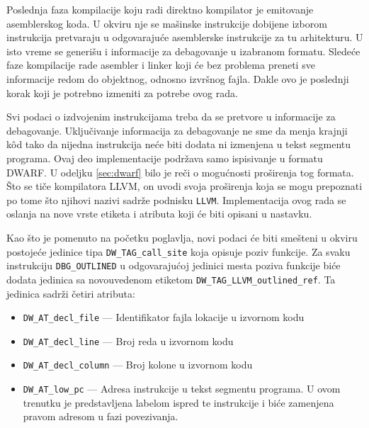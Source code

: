 \documentclass[12pt,oneside]{memoir}
\begin{document}
Poslednja faza kompilacije koju radi direktno kompilator je emitovanje asemblerskog koda.
U okviru nje se mašinske instrukcije dobijene izborom instrukcija pretvaraju u odgovarajuće asemblerske instrukcije za tu arhitekturu.
U isto vreme se generišu i informacije za debagovanje u izabranom formatu.
Sledeće faze kompilacije rade asembler i linker koji će bez problema preneti sve informacije redom do objektnog, odnosno izvršnog fajla.
Dakle ovo je poslednji korak koji je potrebno izmeniti za potrebe ovog rada.


Svi podaci o izdvojenim instrukcijama treba da se pretvore u informacije za debagovanje.
Uključivanje informacija za debagovanje ne sme da menja krajnji k\^od tako da nijedna instrukcija neće biti dodata ni izmenjena u tekst segmentu programa.
Ovaj deo implementacije podržava samo ispisivanje u formatu DWARF.
U odeljku \ref{sec:dwarf} bilo je reči o mogućnosti proširenja tog formata.
Što se tiče kompilatora LLVM, on uvodi svoja proširenja
koja se mogu prepoznati po tome što njihovi nazivi sadrže podnisku \verb|LLVM|.
Implementacija ovog rada se oslanja na nove vrste etiketa i atributa koji će biti opisani u nastavku.

Kao što je pomenuto na početku poglavlja, novi podaci će biti smešteni u okviru postojeće jedinice tipa \verb|DW_TAG_call_site| koja opisuje poziv funkcije.
Za svaku instrukciju \verb|DBG_OUTLINED| u odgovarajućoj jedinici mesta poziva funkcije biće dodata jedinica sa novouvedenom etiketom \verb|DW_TAG_LLVM_outlined_ref|.
Ta jedinica sadrži četiri atributa:
\begin{itemize}
  \item \verb|DW_AT_decl_file| --- Identifikator fajla lokacije u izvornom kodu
  \item \verb|DW_AT_decl_line| --- Broj reda u izvornom kodu
  \item \verb|DW_AT_decl_column| --- Broj kolone u izvornom kodu
  \item \verb|DW_AT_low_pc| --- Adresa instrukcije u tekst segmentu programa. U ovom trenutku je predstavljena labelom ispred te instrukcije i biće zamenjena pravom adresom u fazi povezivanja.
\end{itemize}
\end{document}
